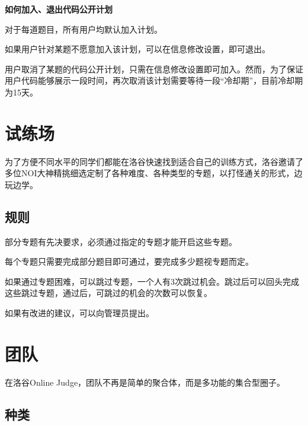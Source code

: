 \documentclass[10pt,a4paper]{article}
\begin{document}
		\textbf{{
				如何加入、退出代码公开计划}}
		\begin{itemize}{
				\item 
				
				
				对于每道题目，所有用户均默认加入计划。
				\item 
				
				
				如果用户针对某题不愿意加入该计划，可以在信息修改设置，即可退出。
				\item 
				用户取消了某题的代码公开计划，只需在信息修改设置即可加入。然而，为了保证用户代码能够展示一段时间，再次取消该计划需要等待一段“冷却期”，目前冷却期为15天。}
		\end{itemize}
		
		\section{
			试练场}
		
		
		为了方便不同水平的同学们都能在洛谷快速找到适合自己的训练方式，洛谷邀请了多位NOI大神精挑细选定制了各种难度、各种类型的专题，以打怪通关的形式，边玩边学。
		
		\subsection{
			规则}
		\begin{itemize}{
				\item 
				
				
				部分专题有先决要求，必须通过指定的专题才能开启这些专题。
				\item 
				
				
				每个专题只需要完成部分题目即可通过，要完成多少题视专题而定。
				\item 
				
				
				如果通过专题困难，可以跳过专题，一个人有3次跳过机会。跳过后可以回头完成这些跳过专题，通过后，可跳过的机会的次数可以恢复。
				\item 如果有改进的建议，可以向管理员提出。}
		\end{itemize}
		
		\section{
			团队}
		
		
		在洛谷Online Judge，团队不再是简单的聚合体，而是多功能的集合型圈子。
		
		\subsection{
			种类}
		
\end{document}
